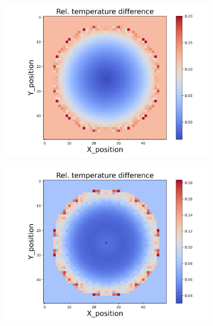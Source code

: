 \begin{figure}[h]
\begin{minipage}{\textwidth}
\begin{subfigure}{0.325\textwidth}
        \end{subfigure}
        \begin{subfigure}{0.325\textwidth}
            \centering
            \includegraphics[width=\textwidth]{figures/raw_data/23/mix/T_bias.jpg}
        \end{subfigure}
        \begin{subfigure}{0.325\textwidth}
            \centering
            \includegraphics[width=\textwidth]{figures/raw_data/24/mix/T_bias.jpg}
        \end{subfigure}
    \end{minipage}\\

\end{figure}

